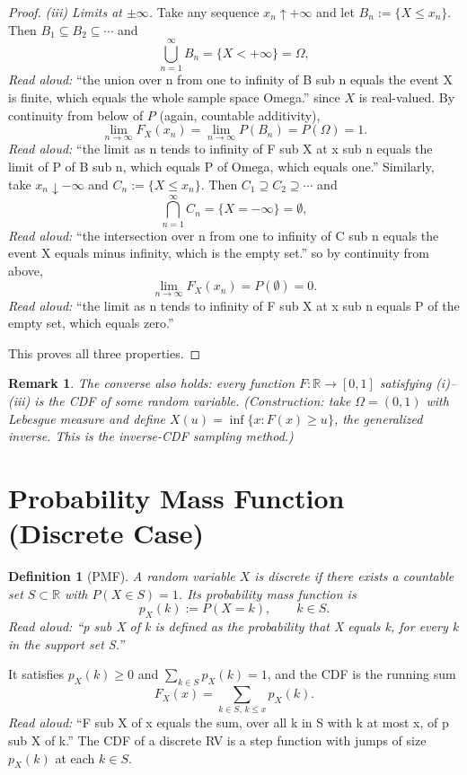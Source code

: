 \documentclass[11pt]{article}
\newtheorem{definition}{Definition}
\newtheorem{remark}{Remark}
\begin{document}
\begin{proof}
\emph{(iii) Limits at $\pm \infty$.} Take any sequence $x_n \uparrow +\infty$ and let $B_n := \{X \le x_n\}$. Then $B_1 \subseteq B_2 \subseteq \cdots$ and
\[
\bigcup_{n=1}^\infty B_n = \{X < +\infty\} = \Omega,
\]
\emph{Read aloud:} ``the union over n from one to infinity of B sub n equals the event X is finite, which equals the whole sample space Omega.''
since $X$ is real-valued. By continuity from below of $P$ (again, countable additivity),
\[
\lim_{n \to \infty} F_X(x_n) = \lim_{n \to \infty} P(B_n) = P(\Omega) = 1.
\]
\emph{Read aloud:} ``the limit as n tends to infinity of F sub X at x sub n equals the limit of P of B sub n, which equals P of Omega, which equals one.''
Similarly, take $x_n \downarrow -\infty$ and $C_n := \{X \le x_n\}$. Then $C_1 \supseteq C_2 \supseteq \cdots$ and
\[
\bigcap_{n=1}^\infty C_n = \{X = -\infty\} = \emptyset,
\]
\emph{Read aloud:} ``the intersection over n from one to infinity of C sub n equals the event X equals minus infinity, which is the empty set.''
so by continuity from above,
\[
\lim_{n \to \infty} F_X(x_n) = P(\emptyset) = 0.
\]
\emph{Read aloud:} ``the limit as n tends to infinity of F sub X at x sub n equals P of the empty set, which equals zero.''

This proves all three properties.
\end{proof}

\begin{remark}
The converse also holds: every function $F : \mathbb{R} \to [0,1]$ satisfying (i)--(iii) is the CDF of some random variable. (Construction: take $\Omega = (0,1)$ with Lebesgue measure and define $X(u) = \inf\{x : F(x) \ge u\}$, the generalized inverse. This is the inverse-CDF sampling method.)
\end{remark}

\section{Probability Mass Function (Discrete Case)}

\begin{definition}[PMF]
A random variable $X$ is \emph{discrete} if there exists a countable set $S \subset \mathbb{R}$ with $P(X \in S) = 1$. Its \emph{probability mass function} is
\[
p_X(k) := P(X = k), \qquad k \in S.
\]
\emph{Read aloud:} ``p sub X of k is defined as the probability that X equals k, for every k in the support set S.''
\end{definition}

It satisfies $p_X(k) \ge 0$ and $\sum_{k \in S} p_X(k) = 1$, and the CDF is the running sum
\[
F_X(x) = \sum_{k \in S,\, k \le x} p_X(k).
\]
\emph{Read aloud:} ``F sub X of x equals the sum, over all k in S with k at most x, of p sub X of k.''
The CDF of a discrete RV is a step function with jumps of size $p_X(k)$ at each $k \in S$.
\end{document}
